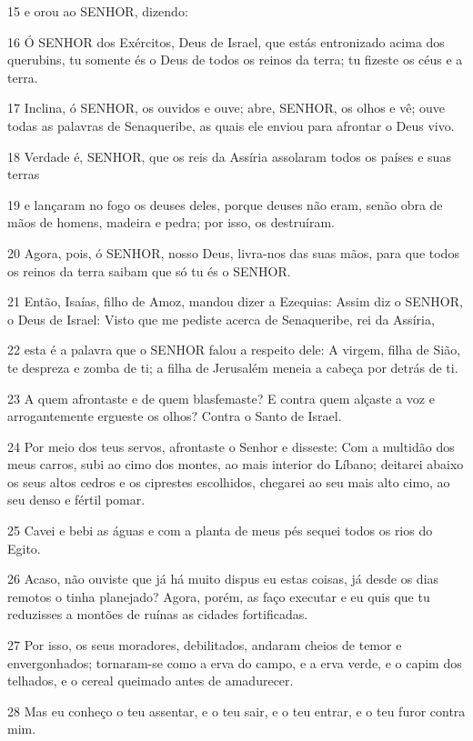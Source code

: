 \par 15 e orou ao SENHOR, dizendo:
\par 16 Ó SENHOR dos Exércitos, Deus de Israel, que estás entronizado acima dos querubins, tu somente és o Deus de todos os reinos da terra; tu fizeste os céus e a terra.
\par 17 Inclina, ó SENHOR, os ouvidos e ouve; abre, SENHOR, os olhos e vê; ouve todas as palavras de Senaqueribe, as quais ele enviou para afrontar o Deus vivo.
\par 18 Verdade é, SENHOR, que os reis da Assíria assolaram todos os países e suas terras
\par 19 e lançaram no fogo os deuses deles, porque deuses não eram, senão obra de mãos de homens, madeira e pedra; por isso, os destruíram.
\par 20 Agora, pois, ó SENHOR, nosso Deus, livra-nos das suas mãos, para que todos os reinos da terra saibam que só tu és o SENHOR.
\par 21 Então, Isaías, filho de Amoz, mandou dizer a Ezequias: Assim diz o SENHOR, o Deus de Israel: Visto que me pediste acerca de Senaqueribe, rei da Assíria,
\par 22 esta é a palavra que o SENHOR falou a respeito dele: A virgem, filha de Sião, te despreza e zomba de ti; a filha de Jerusalém meneia a cabeça por detrás de ti.
\par 23 A quem afrontaste e de quem blasfemaste? E contra quem alçaste a voz e arrogantemente ergueste os olhos? Contra o Santo de Israel.
\par 24 Por meio dos teus servos, afrontaste o Senhor e disseste: Com a multidão dos meus carros, subi ao cimo dos montes, ao mais interior do Líbano; deitarei abaixo os seus altos cedros e os ciprestes escolhidos, chegarei ao seu mais alto cimo, ao seu denso e fértil pomar.
\par 25 Cavei e bebi as águas e com a planta de meus pés sequei todos os rios do Egito.
\par 26 Acaso, não ouviste que já há muito dispus eu estas coisas, já desde os dias remotos o tinha planejado? Agora, porém, as faço executar e eu quis que tu reduzisses a montões de ruínas as cidades fortificadas.
\par 27 Por isso, os seus moradores, debilitados, andaram cheios de temor e envergonhados; tornaram-se como a erva do campo, e a erva verde, e o capim dos telhados, e o cereal queimado antes de amadurecer.
\par 28 Mas eu conheço o teu assentar, e o teu sair, e o teu entrar, e o teu furor contra mim.
